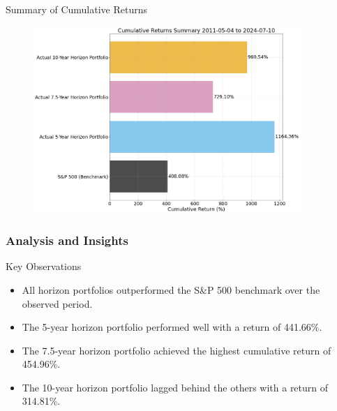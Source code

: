 \documentclass{beamer}
\begin{document}
\begin{frame}{Summary of Cumulative Returns}
    \begin{figure}
        \centering
        \includegraphics[width=0.9\textwidth]{../Figures/cumulative_returns_summary.png}
    \end{figure}
\end{frame}

\begin{frame}
\frametitle{Analysis and Insights}
    \begin{block}{Key Observations}
        \begin{itemize}
            \item All horizon portfolios outperformed the S\&P 500 benchmark over the observed period.
            \item The 5-year horizon portfolio performed well with a return of 441.66\%.
            \item The 7.5-year horizon portfolio achieved the highest cumulative return of 454.96\%.
            \item The 10-year horizon portfolio lagged behind the others with a return of 314.81\%.
        \end{itemize}
    \end{block}
\end{frame}
\end{document}
